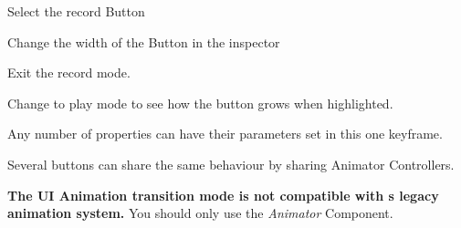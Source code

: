 \begin{DoxyItemize}
\item Select the record Button
\item Change the width of the Button in the inspector
\item Exit the record mode.
\end{DoxyItemize}

Change to play mode to see how the button grows when highlighted.

Any number of properties can have their parameters set in this one keyframe.

Several buttons can share the same behaviour by sharing Animator Controllers.

{\bfseries{The UI Animation transition mode is not compatible with \textquotesingle{}s legacy animation system.}} You should only use the {\itshape Animator} Component. 